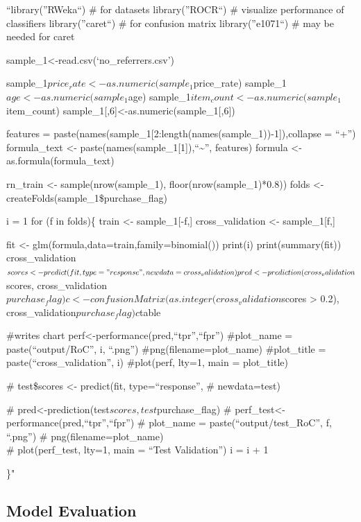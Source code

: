 \documentclass[]{article}
\begin{document}
``library(''RWeka``) \# for datasets library(''ROCR``) \# visualize
performance of classifiers library(''caret``) \# for confusion matrix
library(''e1071``) \# may be needed for caret

sample\_1\textless{}-read.csv(`no\_referrers.csv')

sample\_1$price_rate<-as.numeric(sample_1$price\_rate)
sample\_1$age<-as.numeric(sample_1$age)
sample\_1$item_count<-as.numeric(sample_1$item\_count)
sample\_1{[},6{]}\textless{}-as.numeric(sample\_1{[},6{]})

features =
paste(names(sample\_1{[}2:length(names(sample\_1))-1{]}),collapse =
``+'') formula\_text \textless{}-
paste(names(sample\_1{[}1{]}),``\textasciitilde{}'', features) formula
\textless{}- as.formula(formula\_text)

rn\_train \textless{}- sample(nrow(sample\_1),
floor(nrow(sample\_1)*0.8)) folds \textless{}-
createFolds(sample\_1\$purchase\_flag)

i = 1 for (f in folds)\{ train \textless{}- sample\_1{[}-f,{]}
cross\_validation \textless{}- sample\_1{[}f,{]}

fit \textless{}- glm(formula,data=train,family=binomial()) print(i)
print(summary(fit))
cross\_validation$scores <- predict(fit, type="response",                        newdata=cross_validation)   pred<-prediction(cross_validation$scores,
cross\_validation$purchase_flag)   c <- confusionMatrix(as.integer(cross_validation$scores
\textgreater{} 0.2), cross\_validation$purchase_flag)   c$table

\#writes chart perf\textless{}-performance(pred,``tpr'',``fpr'')
\#plot\_name = paste(``output/RoC'', i, ``.png'')
\#png(filename=plot\_name) \#plot\_title = paste(``cross\_validation'',
i) \#plot(perf, lty=1, main = plot\_title)

\# test\$scores \textless{}- predict(fit, type=``response'', \#
newdata=test)

\# pred\textless{}-prediction(test$scores, test$purchase\_flag) \#
perf\_test\textless{}-performance(pred,``tpr'',``fpr'') \# plot\_name =
paste(``output/test\_RoC'', f, ``.png'') \# png(filename=plot\_name)\\
\# plot(perf\_test, lty=1, main = ``Test Validation'') i = i + 1

\}"

\subsection{Model Evaluation}\label{model-evaluation}
\end{document}
